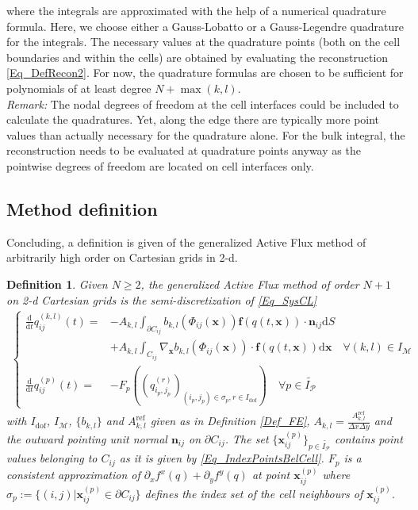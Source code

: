 \documentclass[12pt,a4paper]{article}
\newtheorem{definition}{Definition}
\begin{document}
where the integrals are approximated with the help of a numerical quadrature formula. Here, we choose either a Gauss-Lobatto or a Gauss-Legendre quadrature for the integrals. The necessary values at the quadrature points (both on the cell boundaries and within the cells) are obtained by evaluating the reconstruction \eqref{Eq_DefRecon2}. For now, the quadrature formulas are chosen to be sufficient for polynomials of at least degree $N + \max(k,l)$.\\
\noindent\emph{Remark:} The nodal degrees of freedom at the cell interfaces could be included to calculate the quadratures. Yet, along the edge there are typically more point values than actually necessary for the quadrature alone. For the bulk integral, the reconstruction needs to be evaluated at quadrature points anyway as the pointwise degrees of freedom are located on cell interfaces only.




 


\subsection{Method definition}
\label{Chap_MethodDef}

Concluding, a definition is given of the generalized Active Flux method of arbitrarily high order on Cartesian grids in 2-d.
\begin{definition}\label{Def_GenAF}
Given $N \geq 2$, the \emph{generalized Active Flux method of order $N+1$} on 2-d Cartesian grids is the semi-discretization of \eqref{Eq_SysCL}\\
\begin{align*}
\left\lbrace
\begin{aligned}
	\frac{\mathrm d}{\mathrm dt} q_{ij}^{(k,l)}(t) =&- A_{k,l} \int_{\partial C_{ij}} b_{k,l}(\Phi_{ij}(\mathbf x)) \mathbf f(q(t,\mathbf x)) \cdot \mathbf n_{ij} \mathrm{d} S\\
									  &+ A_{k,l} \int_{C_{ij}} \nabla_{\mathbf x} b_{k,l}(\Phi_{ij}(\mathbf x)) \cdot \mathbf f(q(t,\mathbf x)) \mathrm d \mathbf x \quad \forall (k,l) \in I_{\mathcal M}\\
	\frac{\mathrm d}{\mathrm dt} q_{ij}^{(p)}(t) =& -F_p\left(\left(q_{i_p, j_p}^{(r)}\right)_{(i_p, j_p) \in \sigma_{p}, r \in I_\mathrm{dof}}\right) \quad \forall p \in \widetilde{I_{\mathcal P}}
\end{aligned}
\right.
\end{align*}
with $I_\mathrm{dof}$, $I_{\mathcal M}$, $\{b_{k,l}\}$ and $A^\mathrm{ref}_{k,l}$ given as in Definition \ref{Def_FE}, \(A_{k,l}=\tfrac{A^\mathrm{ref}_{k,l}}{\Delta x \Delta y}\) and the outward pointing unit normal $\mathbf n_{ij}$ on $\partial C_{ij}$. 
The set \(\big\{\mathbf x_{ij}^{(p)}\big\}_{p \in \widetilde{I_{\mathcal P}}}\) contains point values belonging to $C_{ij}$ as it is given by \eqref{Eq_IndexPointsBelCell}. 
$F_p$ is a consistent approximation of $\partial_x f^x(q) + \partial_y f^y(q)$ at point $\mathbf x_{ij}^{(p)}$ where $\sigma_p := \big\{(i,j) \big| \mathbf x_{ij}^{(p)} \in \partial C_{ij}\big\}$ defines the index set of the cell neighbours of $\mathbf x_{ij}^{(p)}$. 
\end{definition}
\end{document}
